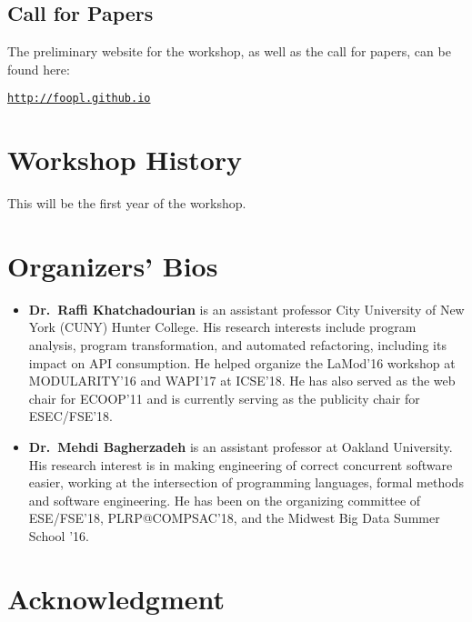 \documentclass[10pt, conference]{IEEEtran}
\begin{document}
\subsection{Call for Papers}

The preliminary website for the workshop, as well as the call for papers, can be found here:

\begin{center}
  \texttt{\url{http://foopl.github.io}}
\end{center}

\section{Workshop History}

This will be the first year of the workshop.

\section{Organizers' Bios}

\begin{itemize}

	\item \textbf{Dr.~Raffi Khatchadourian} is an assistant professor City University of New York (CUNY) Hunter College. His research interests include program analysis, program transformation, and automated refactoring, including its impact on API consumption. He helped organize the LaMod'16 workshop at MODULARITY'16 and WAPI'17 at ICSE'18. He has also served as the web chair for ECOOP'11 and is currently serving as the publicity chair for ESEC/FSE'18.

	\item \textbf{Dr.~Mehdi Bagherzadeh} is an assistant professor at Oakland University. His research interest is in making engineering of correct concurrent software easier, working at the intersection of programming languages, formal methods and software engineering. He has been on the organizing committee of ESE/FSE'18, PLRP@COMPSAC'18, and the Midwest Big Data Summer School '16.

\end{itemize}

\section*{Acknowledgment}
\end{document}
